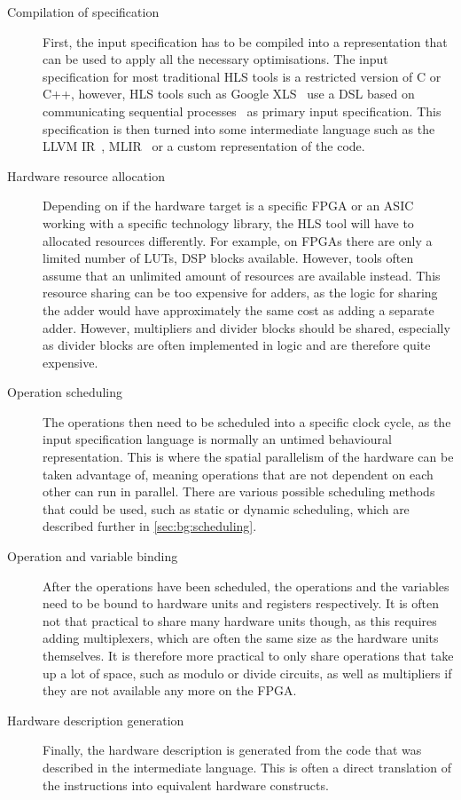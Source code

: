 \begin{description}
\item[Compilation of specification] First, the input specification has to be
  compiled into a representation that can be used to apply all the necessary
  optimisations.  The input specification for most traditional \gls{HLS} tools
  is a restricted version of C or C++, however, \gls{HLS} tools such as Google
  XLS~\cite{google23_xls} use a \gls{DSL} based on communicating sequential
  processes~\cite{hoare78_commun_sequen_proces} as primary input specification.
  This specification is then turned into some intermediate language such as the
  LLVM \gls{IR}~\cite{lattner04_llvm}, MLIR~\cite{lattner21_mlir} or a custom
  representation of the code.

\item[Hardware resource allocation] Depending on if the hardware target is a
  specific \gls{FPGA} or an \gls{ASIC} working with a specific technology
  library, the \gls{HLS} tool will have to allocated resources differently.  For
  example, on \glspl{FPGA} there are only a limited number of \glspl{LUT},
  \gls{DSP} blocks available. However, tools often assume that an unlimited
  amount of resources are available instead.  This resource sharing can be too
  expensive for adders, as the logic for sharing the adder would have
  approximately the same cost as adding a separate adder.  However, multipliers
  and divider blocks should be shared, especially as divider blocks are often
  implemented in logic and are therefore quite expensive.

\item[Operation scheduling] The operations then need to be scheduled into a
  specific clock cycle, as the input specification language is normally an
  untimed behavioural representation.  This is where the spatial parallelism of
  the hardware can be taken advantage of, meaning operations that are not
  dependent on each other can run in parallel.  There are various possible
  scheduling methods that could be used, such as static or dynamic scheduling,
  which are described further in \cref{sec:bg:scheduling}.

\item[Operation and variable binding] After the operations have been scheduled,
  the operations and the variables need to be bound to hardware units and
  registers respectively.  It is often not that practical to share many hardware
  units though, as this requires adding multiplexers, which are often the same
  size as the hardware units themselves.  It is therefore more practical to only
  share operations that take up a lot of space, such as modulo or divide
  circuits, as well as multipliers if they are not available any more on the
  FPGA.

\item[Hardware description generation] Finally, the hardware description is
  generated from the code that was described in the intermediate language.  This
  is often a direct translation of the instructions into equivalent hardware
  constructs.
\end{description}

